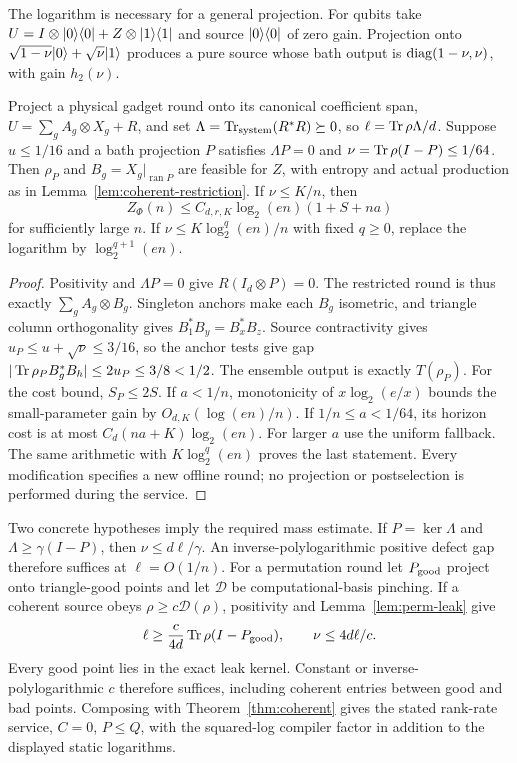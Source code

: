 The logarithm is necessary for a general projection. For qubits take
$U=I\otimes\lvert 0\rangle\langle 0\rvert+Z\otimes\lvert 1\rangle\langle 1\rvert$ and source
$\lvert 0\rangle\langle 0\rvert$ of zero gain. Projection onto
$\sqrt{1-\nu}\lvert 0\rangle+\sqrt\nu\lvert 1\rangle$ produces a pure source whose
bath output is $\operatorname{diag}(1-\nu,\nu)$, with gain $h_2(\nu)$.

\begin{proposition}\label{prop:kernel-concentration}
Project a physical gadget round onto its canonical coefficient span,
$U=\sum_g A_g\otimes X_g+R$, and set
$\Lambda=\operatorname{Tr}_{\rm system}(R^*R)\succeq0$, so
$\ell=\operatorname{Tr}\rho\Lambda/d$. Suppose $u\leq1/16$ and a bath projection
$P$ satisfies $\Lambda P=0$ and $\nu=\operatorname{Tr}\rho(I-P)\leq1/64$.
Then $\rho_P$ and $B_g=X_g|_{\operatorname{ran}P}$ are feasible
for $Z$, with entropy and actual production as in
Lemma~\ref{lem:coherent-restriction}. If $\nu\leq K/n$, then
\begin{equation}\label{eq:kernel-profile-bound}
 Z_\Phi(n)\leq C_{d,r,K}\log_2(en)(1+S+na)
\end{equation}
for sufficiently large $n$. If $\nu\leq K\log_2^q(en)/n$ with
fixed $q\geq0$, replace the logarithm by $\log_2^{q+1}(en)$.
\end{proposition}

\begin{proof}
Positivity and $\Lambda P=0$ give $R(I_d\otimes P)=0$.
The restricted round is thus exactly $\sum_g A_g\otimes B_g$.
Singleton anchors make each $B_g$ isometric, and triangle column
orthogonality gives $B_1^*B_y=B_x^*B_z$. Source contractivity gives
$u_P\leq u+\sqrt\nu\leq3/16$, so the anchor tests give gap
$|\operatorname{Tr}\rho_P B_g^*B_h|\leq2u_P\leq3/8<1/2$.
The ensemble output is exactly $T(\rho_P)$.
For the cost bound, $S_P\leq2S$. If $a<1/n$, monotonicity of
$x\log_2(e/x)$ bounds the small-parameter gain by
$O_{d,K}(\log(en)/n)$. If $1/n\leq a<1/64$, its horizon cost is
at most $C_d(na+K)\log_2(en)$. For larger $a$ use the uniform fallback.
The same arithmetic with $K\log_2^q(en)$ proves the last statement.
Every modification specifies a new offline round; no projection or
postselection is performed during the service.
\end{proof}

Two concrete hypotheses imply the required mass estimate. If
$P=\ker\Lambda$ and $\Lambda\geq\gamma(I-P)$, then
$\nu\leq d\ell/\gamma$. An inverse-polylogarithmic positive defect
gap therefore suffices at $\ell=O(1/n)$.
For a permutation round let $P_{\rm good}$ project onto triangle-good
points and let $\mathcal D$ be computational-basis pinching. If a
coherent source obeys $\rho\geq c\mathcal D(\rho)$, positivity and
Lemma~\ref{lem:perm-leak} give
\[
 \ell\geq\frac{c}{4d}\operatorname{Tr}\rho(I-P_{\rm good}),\qquad
 \nu\leq4d\ell/c.
\]
Every good point lies in the exact leak kernel. Constant or
inverse-polylogarithmic $c$ therefore suffices, including coherent
entries between good and bad points. Composing with
Theorem~\ref{thm:coherent} gives the stated rank-rate service,
$C=0$, $P\leq Q$, with the squared-log compiler factor in addition
to the displayed static logarithms.

